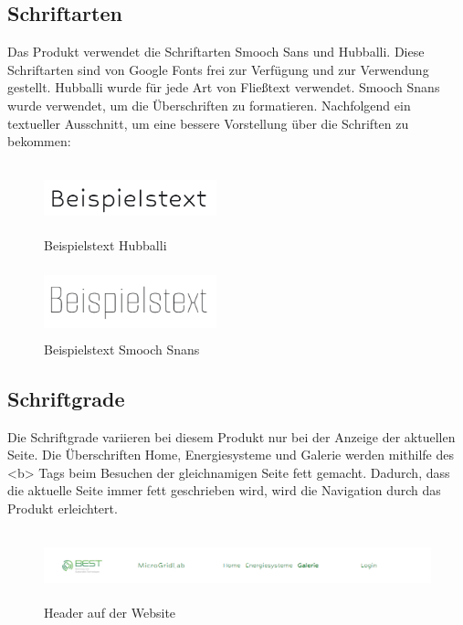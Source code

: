 \subsection{Schriftarten}
Das Produkt verwendet die Schriftarten Smooch Sans und Hubballi. Diese Schriftarten sind von Google Fonts frei zur Verfügung und zur Verwendung gestellt. Hubballi wurde für jede Art von Fließtext verwendet. Smooch Snans wurde verwendet, um die Überschriften zu formatieren. Nachfolgend ein textueller Ausschnitt, um eine bessere Vorstellung über die Schriften zu bekommen:
\begin{figure}[h]
	\centering
	\includegraphics[height=2cm,width=5cm]{images/HubaliBeispielstext}
	\caption{Beispielstext Hubballi}
	\label{fig: Beispielstext Hubballi}
\end{figure}
\begin{figure}[h]
	\centering
	\includegraphics[height=2cm,width=5cm]{images/BeispielstextSmothSans}
	\caption{Beispielstext Smooch Snans}
	\label{fig: BeispielstextSmothSans}
\end{figure}
\subsection{Schriftgrade}
Die Schriftgrade variieren bei diesem Produkt nur bei der Anzeige der aktuellen Seite.
Die Überschriften Home, Energiesysteme und Galerie werden mithilfe des <b> Tags beim Besuchen der gleichnamigen Seite fett gemacht. Dadurch, dass die aktuelle Seite immer fett geschrieben wird, wird die Navigation durch das Produkt erleichtert.
\begin{figure}[h]
	\centering
	\includegraphics[height=2cm,width=15cm]{images/Header}
	\caption{Header auf der Website}
	\label{fig: Header}
\end{figure}
\newpage
